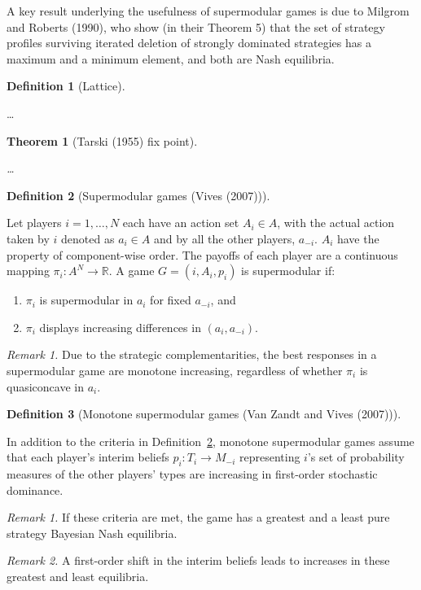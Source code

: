 \documentclass[
]{article}
\theoremstyle{plain}
\newtheorem{theorem}{Theorem}[section]
\theoremstyle{definition}
\newtheorem{definition}{Definition}[section]
\theoremstyle{remark}
\begin{document}
A key result underlying the usefulness of supermodular games is due to
Milgrom and Roberts (1990), who show (in their Theorem 5) that the set
of strategy profiles surviving iterated deletion of strongly dominated
strategies has a maximum and a minimum element, and both are Nash
equilibria.

\begin{definition}[Lattice]\protect\hypertarget{def-lattice}{}\label{def-lattice}

\ldots{}

\end{definition}

\begin{theorem}[Tarski (1955) fix
point]\protect\hypertarget{thm-fixedpoint}{}\label{thm-fixedpoint}

\ldots{}

\end{theorem}

\begin{definition}[Supermodular games (Vives
(2007))]\protect\hypertarget{def-supermodular}{}\label{def-supermodular}

Let players \(i= 1, \dots, N\) each have an action set \(A_i \in A\),
with the actual action taken by \(i\) denoted as \(a_i \in A\) and by
all the other players, \(a_{-i}\). \(A_i\) have the property of
component-wise order. The payoffs of each player are a continuous
mapping \(\pi_i : A^N \to \mathbb{R}\). A game \(G = (i, A_i, p_i)\) is
supermodular if:

\begin{enumerate}
\def\labelenumi{\arabic{enumi}.}
\item
  \(\pi_i\) is supermodular in \(a_i\) for fixed \(a_{-i}\), and
\item
  \(\pi_i\) displays increasing differences in \((a_i, a_{-i})\).
\end{enumerate}

\emph{Remark 1.} Due to the strategic complementarities, the best
responses in a supermodular game are monotone increasing, regardless of
whether \(\pi_i\) is quasiconcave in \(a_i\).

\end{definition}

\begin{definition}[Monotone supermodular games (Van Zandt and Vives
(2007))]\protect\hypertarget{def-monsupermodular}{}\label{def-monsupermodular}

In addition to the criteria in Definition~\ref{def-supermodular},
monotone supermodular games assume that each player's interim beliefs
\(p_i : T_i \to M_{-i}\) representing \(i\)'s set of probability
measures of the other players' types are increasing in first-order
stochastic dominance.

\emph{Remark 1.} If these criteria are met, the game has a greatest and
a least pure strategy Bayesian Nash equilibria.

\emph{Remark 2.} A first-order shift in the interim beliefs leads to
increases in these greatest and least equilibria.

\end{definition}
\end{document}
